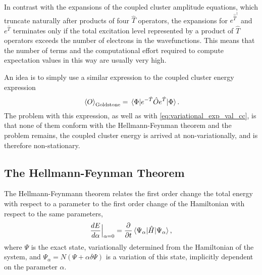 In contrast with the expansions of the coupled cluster amplitude equations, which 
truncate naturally after products of four $\hat{T}$ operators, the expansions for 
$e^{\hat{\hat{T}}^\dagger}$ and $e^{\hat{T}}$ terminates only if the total excitation 
level represented by a product of $\hat{T}$ operators exceeds the number of electrons in 
the wavefunctions. This means that the number of terms and the computational effort
required to compute expectation values in this way are usually very high.

An idea is to simply use a similar expression to the coupled cluster energy
expression
\begin{equation}
    \ev*{O}_{\text{Goldstone}} = \mel{\Phi}{e^{-\hat{T}}\hat{O}e^{\hat{T}}}{\Phi}.
\end{equation}
The problem with this expression, as well as with \autoref{eq:variational_exp_val_cc},
is that none of them conform with the Hellmann-Feynman theorem and the problem remains,
the coupled cluster energy is arrived at non-variationally, and is therefore non-stationary.

\subsection{The Hellmann-Feynman Theorem}

The Hellmann-Feynmann\cite{feynman1939forces} theorem relates the first order change the total energy 
with respect to a parameter to the first order change of the Hamiltonian with 
respect to the same parameters,
\begin{equation}
    \frac{d E}{d\alpha}\Big\lvert_{\alpha=0} = 
    \frac{\partial}{\partial t}\mel{\Psi_\alpha}{\hat{H}}{\Psi_\alpha},
\end{equation}
where $\Psi$ is the exact state, variationally determined from the Hamiltonian of the 
system, and $\Psi_\alpha = N(\Psi + \alpha \delta\Psi)$ is a variation of this state,
implicitly dependent on the parameter $\alpha$.


